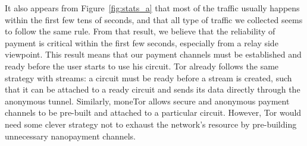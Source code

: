It also appears from Figure~\ref{fig:stats_a} that most of the traffic usually
happens within the first few tens of seconds, and that all type of traffic we
collected seems to follow the same rule. From that result, we believe that the
reliability of payment is critical within the first few seconds, especially from
a relay side viewpoint. This result means that our payment channels must be
established and ready before the user starts to use his circuit. Tor already
follows the same strategy with streams: a circuit must be ready before a stream
is created, such that it can be attached to a ready circuit and sends its data
directly through the anonymous tunnel. Similarly, moneTor allows secure and
anonymous payment channels to be pre-built and attached to a particular
circuit. However, Tor would need some clever strategy not to exhaust the
network's resource by pre-building unnecessary nanopayment channels.


